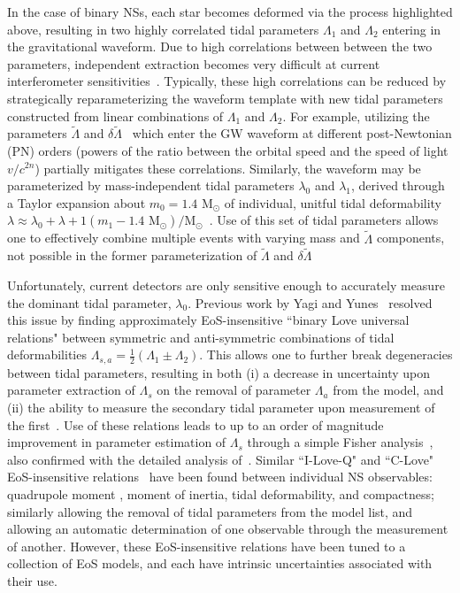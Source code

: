 \documentclass[prd,twocolumn,nofootinbib,superscriptaddress,amsmath,amssymb]{revtex4-1}
\begin{document}
In the case of binary NSs, each star becomes deformed via the process highlighted above, resulting in two highly correlated tidal parameters $\Lambda_1$ and $\Lambda_2$ entering in the gravitational waveform\cite{Flanagan2008,Vines:2011ud}.
Due to high correlations between between the two parameters, independent extraction becomes very difficult at current interferometer sensitivities~\cite{Wade:tidalCorrections}.
Typically, these high correlations can be reduced by strategically reparameterizing the waveform template with new tidal parameters constructed from linear combinations of $\Lambda_1$ and $\Lambda_2$.
For example, utilizing the parameters $\tilde{\Lambda}$ and $\delta \tilde{\Lambda}$~\cite{Favata:2013rwa,Wade:tidalCorrections} which enter the GW waveform at different post-Newtonian (PN) orders (powers of the ratio between the orbital speed and the speed of light $v/c^{2n}$) partially mitigates these correlations.
Similarly, the waveform may be parameterized by mass-independent tidal parameters $\lambda_0$ and $\lambda_1$, derived through a Taylor expansion about $m_0=1.4 \text{ M}_{\odot}$ of individual, unitful tidal deformability $\lambda \approx \lambda_0+\lambda+1(m_1-1.4 \text{ M}_{\odot})/\text{M}_{\odot}$~\cite{delPozzo:TaylorTidal}. 
Use of this set of tidal parameters allows one to effectively combine multiple events with varying mass and $\tilde\Lambda$ components, not possible in the former parameterization of $\tilde{\Lambda}$ and $\delta \tilde{\Lambda}$

Unfortunately, current detectors are only sensitive enough to accurately measure the dominant tidal parameter, $\lambda_0$.
Previous work by Yagi and Yunes~\cite{Yagi:binLove} resolved this issue by finding approximately EoS-insensitive ``binary Love universal relations" between symmetric and anti-symmetric combinations of tidal deformabilities $\Lambda_{s,a}=\frac{1}{2}(\Lambda_1 \pm \Lambda_2)$.
This allows one to further break degeneracies between tidal parameters, resulting in both (i) a decrease in uncertainty upon parameter extraction of $\Lambda_s$ on the removal of parameter $\Lambda_a$ from the model, and (ii) the ability to measure the secondary tidal parameter upon measurement of the first~\cite{Katerina:residuals}.  
Use of these relations leads to up to an order of magnitude improvement in parameter estimation of $\Lambda_s$ through a simple Fisher analysis~\cite{Yagi:binLove}, also confirmed with the detailed analysis of~\cite{Katerina:residuals}.
Similar ``I-Love-Q" and ``C-Love" EoS-insensitive relations~\cite{Yagi:ILQ} have been found between individual NS observables: quadrupole moment , moment of inertia, tidal deformability, and compactness; similarly allowing the removal of tidal parameters from the model list, and allowing an automatic determination of one observable through the measurement of another.
However, these EoS-insensitive relations have been tuned to a collection of EoS models, and each have intrinsic uncertainties associated with their use.
\end{document}

